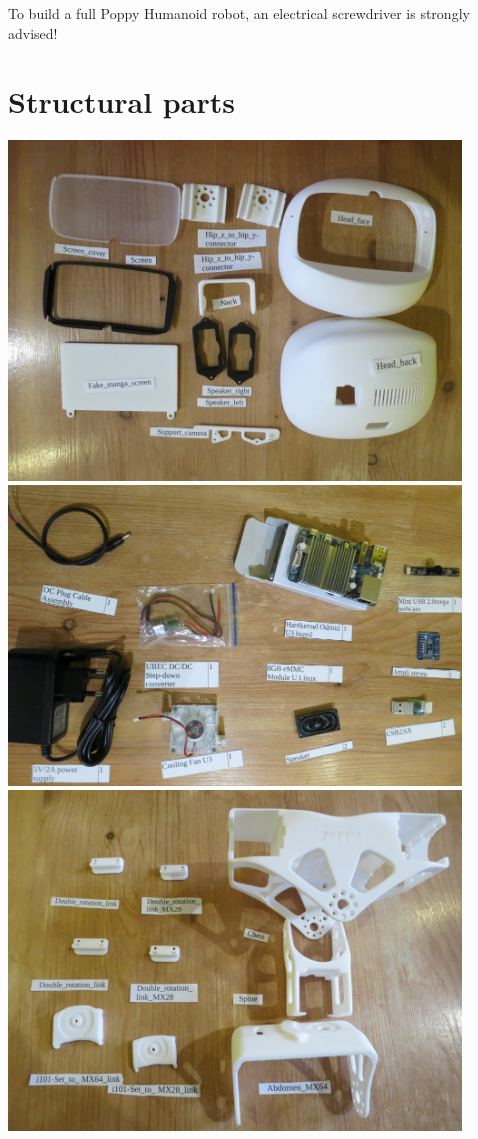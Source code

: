 \documentclass{article}
\begin{document}
 To build a full Poppy Humanoid robot, an electrical screwdriver is strongly advised!

\section{Structural parts}

 \begin{center}
  \includegraphics[width=0.9\textwidth]{img/parts_head}\\
  \vspace{1mm}
  \includegraphics[width=0.9\textwidth]{img/parts_electronics}\\
  \vspace{1mm}
  \includegraphics[width=0.9\textwidth]{img/parts_chest}\\

\end{center}
\end{document}
